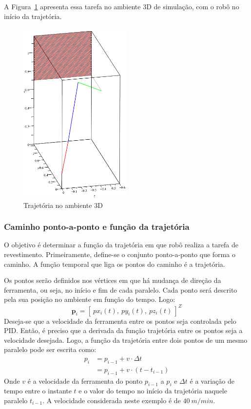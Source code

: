 A Figura~\ref{fig::trajec3D_600x500x10} apresenta essa tarefa no ambiente 3D
de simulação, com o robô no início da trajetória. 

\begin{figure}[h!]
	\centering 
 	\includegraphics[width=0.50\textwidth]{figs/trajec3D_600x500x10}
 	\caption{Trajetória no ambiente 3D}
 	\label{fig::trajec3D_600x500x10}
\end{figure}

\subsubsection{Caminho ponto-a-ponto e função da trajetória}

O objetivo é determinar a função da trajetória em que robô realiza a tarefa de
revestimento. Primeiramente, define-se o conjunto ponto-a-ponto que forma o
caminho. A função temporal que liga os pontos do caminho é a trajetória.

Os pontos serão definidos nos vértices em que há mudança de direção da
ferramenta, ou seja, no início e fim de cada paralelo. Cada ponto será descrito
pela sua posição no ambiente em função do tempo. Logo:
%
\begin{equation} \label{eq::posi}
	\mathbf{p}_i = [~ px_{i}(t),~ py_{i}(t),~ pz_{i}(t)~]^Z
\end{equation}
%
Deseja-se que a velocidade da ferramenta entre os pontos seja controlada pelo
PID. Então, é preciso que a derivada da função trajetória entre os pontos seja a
velocidade desejada. Logo, a função da trajetória entre dois pontos de um mesmo
paralelo pode ser escrita como:
%
\begin{equation} \label{eq::pi}
\begin{split}
	p_i & = p_{i-1} + v \cdot \Delta t \\
		& = p_{i-1} + v \cdot (t-t_{i-1})
\end{split}
\end{equation}
%
Onde $v$ é a velocidade da ferramenta do ponto $p_{i-1}$ a $p_{i}$ e
$\Delta t$ é a variação de tempo entre o instante $t$ e o valor do tempo no
início da trajetória naquele paralelo $t_{i-1}$. A velocidade considerada neste
exemplo é de $40~m/min$.

